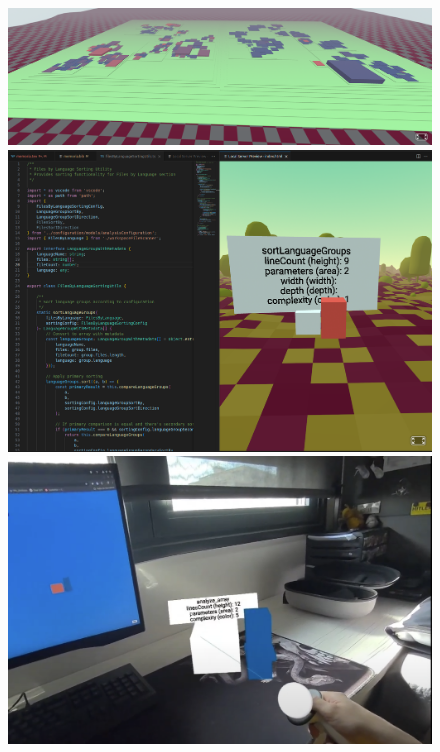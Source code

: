 \documentclass[a4paper, 12pt]{book}
\begin{document}
\begin{figure}[H]
\centering
\begin{minipage}[b]{0.32\textwidth}
\centering
\includegraphics[width=\textwidth]{img/analisis-proyecto-completo.png}
\end{minipage}
\hfill
\begin{minipage}[b]{0.32\textwidth}
\centering
\includegraphics[width=\textwidth]{img/xr-fichero-analisis.png}
\end{minipage}
\hfill
\begin{minipage}[b]{0.32\textwidth}
\centering
\includegraphics[width=\textwidth]{img/xr-experiencia-ar.png}

\end{minipage}
\end{figure}
\end{document}
